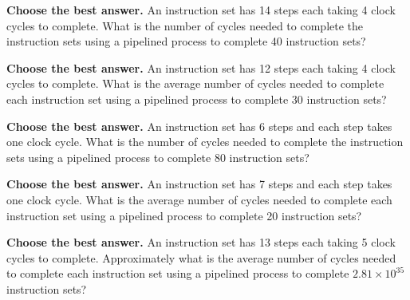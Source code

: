 \documentclass{exam}
\newcommand{\itemSpace}{36pt} %
\newenvironment{answer}
{%
  \global\setbox\allanswers=\vbox\bgroup %
  \unvbox\allanswers%
    \textbf{\thequestion.}  \thechoice\\
}%
{%
  \egroup%
}
\newcommand{\CC}{\CorrectChoice \leavevmode \begin{answer} \end{answer}}%
\begin{document}
\begin{questions}
\setlength\itemsep{\itemSpace} %
\question \textbf{Choose the best answer.}
        An instruction set has 14 steps each taking 4 clock cycles to complete. 
        What is the number of cycles needed to complete the instruction sets using a pipelined process to complete 40 instruction sets?
        

\question \textbf{Choose the best answer.}
        An instruction set has 12 steps each taking 4 clock cycles to complete. 
        What is the average number of cycles needed to complete each instruction set using a pipelined process to complete 30 instruction sets?
        
		\begin{choices}
			\CC 5.467
		\end{choices}

\question \textbf{Choose the best answer.}
        An instruction set has 6 steps and each step takes one clock cycle. 
        What is the number of cycles needed to complete the instruction sets using a pipelined process to complete 80 instruction sets?
        
		\begin{choices}
			\CC 85
		\end{choices}

\question \textbf{Choose the best answer.}
        An instruction set has 7 steps and each step takes one clock cycle. 
        What is the average number of cycles needed to complete each instruction set using a pipelined process to complete 20 instruction sets?
        
		\begin{choices}
			\CC 1.3
		\end{choices}

\question \textbf{Choose the best answer.}
        An instruction set has 13 steps each taking 5 clock cycles to complete. 
        Approximately what is the average number of cycles needed to complete each instruction set using a pipelined process to complete 
        $2.81\times 10^{35}$ instruction sets?
        

\end{questions}
\end{document}

